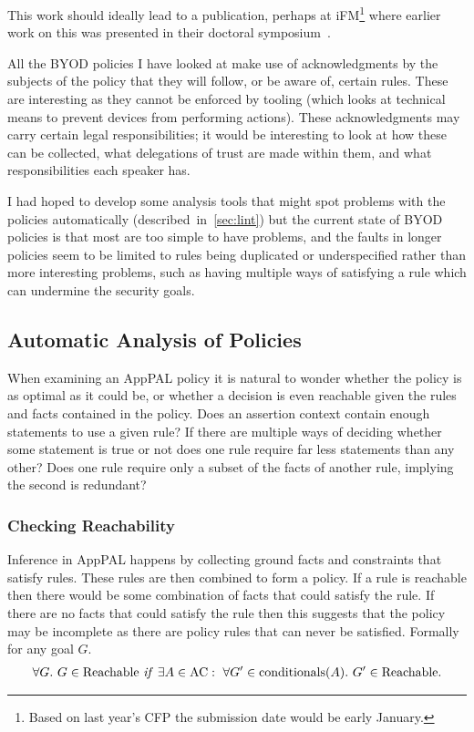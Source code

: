 \documentclass[a4paper]{scrartcl}
\begin{document}
This  work should ideally lead to a publication, perhaps at
iFM\footnote{Based on last year's CFP the submission date would be early January.} where
earlier work on this was presented in their doctoral
symposium~\cite{hallett_specifying_2016}.

All the BYOD policies I have looked at make use of acknowledgments by the
subjects of the policy that they will follow, or be aware of, certain rules.
These are interesting as they cannot be enforced by tooling (which
looks at technical means to prevent devices from performing actions).  These
acknowledgments may carry certain legal responsibilities; it would be
interesting to look at how these can be collected, what delegations of trust
are made within them, and what responsibilities each speaker has.

I had hoped to develop some analysis tools that might spot problems with the
policies automatically (described~in~\autoref{sec:lint}) but the current state
of BYOD policies is that most are too simple to have problems, and the faults in
longer policies seem to be limited to rules being duplicated or underspecified
rather than more interesting problems,  such as having multiple ways of
satisfying a rule which can undermine the security goals.

\subsection{Automatic Analysis of Policies}
\label{sec:lint}

When examining an AppPAL policy it is natural to wonder whether the policy is as
optimal as it could be, or whether a decision is even reachable given the rules
and facts contained in the policy. Does an assertion context contain enough
statements to use a given rule? If there are multiple ways of deciding whether
some statement is true or not does one rule require far less statements than any
other? Does one rule require only a subset of the facts of another rule,
implying the second is redundant?

\subsubsection{Checking Reachability}

Inference in AppPAL happens by collecting ground facts and constraints that
satisfy rules. These rules are then combined to form a policy. If a rule is
reachable then there would be some combination of facts that could satisfy the
rule. If there are no facts that could satisfy the rule then this suggests that
the policy may be incomplete as there are policy rules that can never be
satisfied.  Formally for any goal $G$.
\begin{align*}
  \forall G.~G \in \text{Reachable}~\text{\textit{if}}~\exists A \in \text{AC}:~\forall G^\prime \in \text{conditionals}(A).~G^\prime \in \text{Reachable}.
\end{align*}
\end{document}
